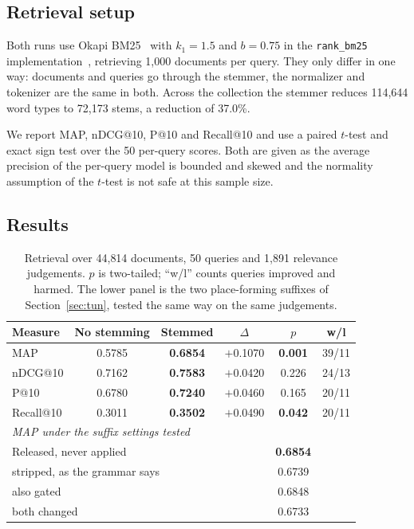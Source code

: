 \documentclass[conference]{IEEEtran}
\newcommand{\ps}[1]{{\pashtofont\textpashto{#1}}}
\begin{document}
\subsection{Retrieval setup}

Both runs use Okapi BM25~\cite{robertson2009} with $k_1 = 1.5$ and $b = 0.75$ in
the \texttt{rank\_bm25} implementation~\cite{rankbm25}, retrieving 1{,}000
documents per query. They only differ in one way: documents and queries go
through the stemmer, the normalizer and tokenizer are the same in both. Across the collection the stemmer reduces 114{,}644 word types
to 72{,}173 stems, a reduction of 37.0\%.

We report MAP, nDCG@10, P@10 and Recall@10 and use a paired $t$-test and exact
sign test over the 50 per-query scores. Both are given as the average precision
of the per-query model is bounded and skewed and the normality assumption of the
$t$-test is not safe at this sample size.

\subsection{Results}

\begin{table}[t]
\caption{Retrieval over 44{,}814 documents, 50 queries and 1{,}891 relevance
judgements. $p$ is two-tailed; ``w/l'' counts queries improved and harmed. The
lower panel is the two place-forming suffixes of Section~\ref{sec:tun}, tested
the same way on the same judgements.}
\label{tab:ir}
\centering
\setlength{\tabcolsep}{4pt}
\begin{tabular}{lccccc}
\toprule
Measure & No stemming & Stemmed & $\Delta$ & $p$ & w/l\\
\midrule
MAP       & 0.5785 & \textbf{0.6854} & $+$0.1070 & \textbf{0.001} & 39/11\\
nDCG@10   & 0.7162 & \textbf{0.7583} & $+$0.0420 & 0.226 & 24/13\\
P@10      & 0.6780 & \textbf{0.7240} & $+$0.0460 & 0.165 & 20/11\\
Recall@10 & 0.3011 & \textbf{0.3502} & $+$0.0490 & \textbf{0.042} & 20/11\\
\midrule
\multicolumn{6}{l}{\emph{MAP under the suffix settings tested}}\\
\multicolumn{4}{l}{Released, \ps{تون} never applied} & \textbf{0.6854} &\\
\multicolumn{4}{l}{\ps{تون} stripped, as the grammar says} & 0.6739 &\\
\multicolumn{4}{l}{\ps{ستان} also gated} & 0.6848 &\\
\multicolumn{4}{l}{both changed} & 0.6733 &\\
\bottomrule
\end{tabular}
\end{table}
\end{document}
